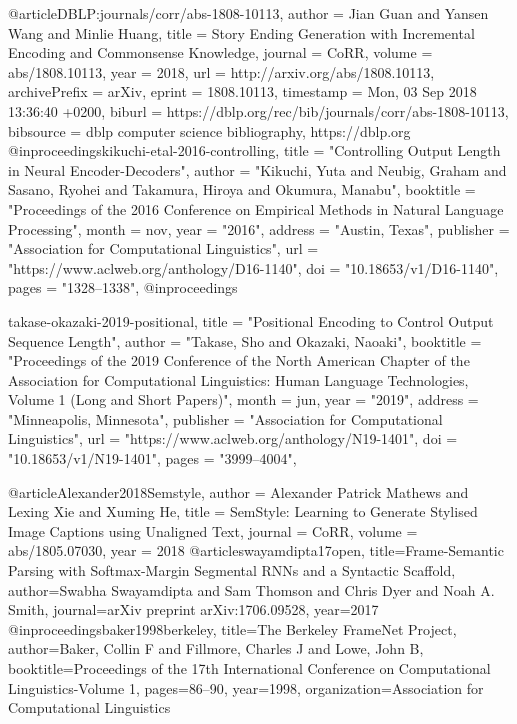 @article{DBLP:journals/corr/abs-1808-10113,
  author    = {Jian Guan and
               Yansen Wang and
               Minlie Huang},
  title     = {Story Ending Generation with Incremental Encoding and Commonsense
               Knowledge},
  journal   = {CoRR},
  volume    = {abs/1808.10113},
  year      = {2018},
  url       = {http://arxiv.org/abs/1808.10113},
  archivePrefix = {arXiv},
  eprint    = {1808.10113},
  timestamp = {Mon, 03 Sep 2018 13:36:40 +0200},
  biburl    = {https://dblp.org/rec/bib/journals/corr/abs-1808-10113},
  bibsource = {dblp computer science bibliography, https://dblp.org}
}
@inproceedings{kikuchi-etal-2016-controlling,
    title = "Controlling Output Length in Neural Encoder-Decoders",
    author = "Kikuchi, Yuta  and
      Neubig, Graham  and
      Sasano, Ryohei  and
      Takamura, Hiroya  and
      Okumura, Manabu",
    booktitle = "Proceedings of the 2016 Conference on Empirical Methods in Natural Language Processing",
    month = nov,
    year = "2016",
    address = "Austin, Texas",
    publisher = "Association for Computational Linguistics",
    url = "https://www.aclweb.org/anthology/D16-1140",
    doi = "10.18653/v1/D16-1140",
    pages = "1328--1338",
}
@inproceedings{takase-okazaki-2019-positional,
    title = "Positional Encoding to Control Output Sequence Length",
    author = "Takase, Sho  and
      Okazaki, Naoaki",
    booktitle = "Proceedings of the 2019 Conference of the North {A}merican Chapter of the Association for Computational Linguistics: Human Language Technologies, Volume 1 (Long and Short Papers)",
    month = jun,
    year = "2019",
    address = "Minneapolis, Minnesota",
    publisher = "Association for Computational Linguistics",
    url = "https://www.aclweb.org/anthology/N19-1401",
    doi = "10.18653/v1/N19-1401",
    pages = "3999--4004",
    
}
@article{Alexander2018Semstyle,
  author    = {Alexander Patrick Mathews and
               Lexing Xie and
               Xuming He},
  title     = {SemStyle: Learning to Generate Stylised Image Captions using Unaligned Text},
  journal   = {CoRR},
  volume    = {abs/1805.07030},
  year      = {2018}
}
@article{swayamdipta17open,
  title={{Frame-Semantic Parsing with Softmax-Margin Segmental RNNs and a Syntactic Scaffold}},
  author={Swabha Swayamdipta and Sam Thomson and Chris Dyer and Noah A. Smith},
  journal={arXiv preprint arXiv:1706.09528},
  year={2017}
}
@inproceedings{baker1998berkeley,
  title={{The Berkeley FrameNet Project}},
  author={Baker, Collin F and Fillmore, Charles J and Lowe, John B},
  booktitle={Proceedings of the 17th International Conference on Computational Linguistics-Volume 1},
  pages={86--90},
  year={1998},
  organization={Association for Computational Linguistics}
}

